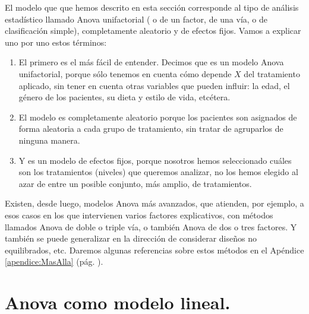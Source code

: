 El modelo que que hemos descrito en esta sección corresponde al tipo de análisis estadístico
llamado {\sf Anova unifactorial ( o de un factor, de una vía, o de clasificación simple), completamente
aleatorio y de efectos fijos}.
Vamos a explicar uno por uno estos términos:
\begin{enumerate}
    \item El primero es el más fácil de entender. Decimos que es un modelo {\sf Anova unifactorial}, porque sólo tenemos en cuenta cómo depende $X$ del tratamiento aplicado, sin tener en cuenta otras variables que pueden influir: la edad, el género de los pacientes, su dieta y estilo de vida, etcétera.

    \item El modelo es {\sf completamente aleatorio} porque los pacientes son asignados de forma aleatoria a cada grupo de tratamiento, sin tratar de agruparlos de ninguna manera.

    \item Y es un {\sf modelo de efectos fijos}, porque nosotros hemos seleccionado cuáles son los tratamientos (niveles) que queremos analizar, no los hemos elegido al azar de entre un posible conjunto, más amplio, de tratamientos.
\end{enumerate}

Existen, desde luego, modelos Anova más avanzados, que atienden, por ejemplo, a esos casos en los que intervienen varios factores explicativos, con métodos llamados {\sf Anova de doble o triple vía}, o también {\sf Anova de dos o tres factores}. Y también se puede generalizar en la dirección de considerar diseños no equilibrados, etc. Daremos algunas referencias sobre estos métodos
en el Apéndice \ref{apendice:MasAlla} (pág. \pageref{apendice:MasAlla}).

\section{Anova como modelo lineal.}
\label{cap11:subsec:AnovaComoModeloLineal}
\\


